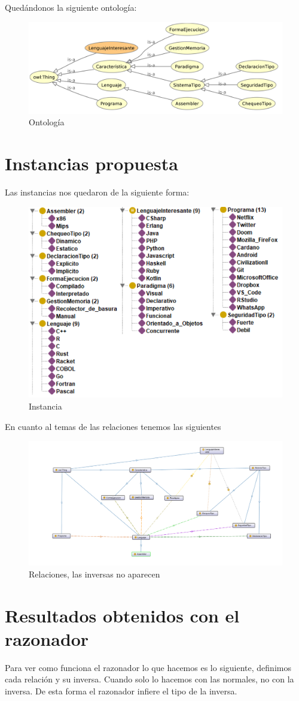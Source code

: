 \documentclass[12pt, titlepage, a4paper]{article}
\begin{document}
\noindent Quedándonos la siguiente ontología:
\begin{figure}[H]
    \centering
    \includegraphics[width=.8\textwidth]{Imagenes/Ontologia.png}
    \caption{Ontología}
\end{figure}

\section{Instancias propuesta}
Las instancias nos quedaron de la siguiente forma:
\begin{figure}[H]
    \centering
    \includegraphics[width=.5\textwidth]{Imagenes/Instancias3.png}
    \caption{Instancia}
\end{figure}

En cuanto al temas de las relaciones tenemos las siguientes
\begin{figure}[H]
    \centering
    \includegraphics[width=.8\textwidth]{Imagenes/Relaciones3.png}
    \caption{Relaciones, las inversas no aparecen}
\end{figure}

\section{Resultados obtenidos con el razonador}
Para ver como funciona el razonador lo que hacemos es lo siguiente, 
definimos cada relación y su inversa. Cuando  solo 
lo hacemos con las normales, no con la inversa. De esta forma el 
razonador infiere el tipo de la inversa.\\
\end{document}
